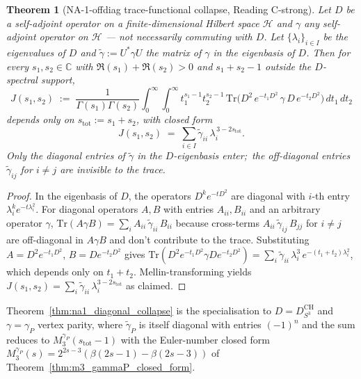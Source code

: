\documentclass[11pt,a4paper]{article}
\theoremstyle{plain}
\newtheorem{theorem}{Theorem}[section]
\theoremstyle{definition}
\newcommand{\sthree}{S^{3}}
\newcommand{\C}{\mathbb{C}}
\newcommand{\Tr}{\mathrm{Tr}}
\newcommand{\Hcal}{\mathcal{H}}
\begin{document}
\begin{theorem}[NA-1-offdiag trace-functional collapse, Reading
C-strong]
\label{thm:na1_trace_functional_collapse}
Let $D$ be a self-adjoint operator on a finite-dimensional Hilbert
space $\Hcal$ and $\gamma$ \emph{any} self-adjoint operator on
$\Hcal$ --- not necessarily commuting with $D$.  Let
$\{\lambda_i\}_{i \in I}$ be the eigenvalues of $D$ and
$\widetilde{\gamma} := U^* \gamma U$ the matrix of $\gamma$ in the
eigenbasis of $D$.  Then for every $s_1, s_2 \in \C$ with
$\Re(s_1) + \Re(s_2) > 0$ and $s_1 + s_2 - 1$ outside the
$D$-spectral support,
\begin{equation}
\label{eq:na1_J_general}
J(s_1, s_2)
\;:=\; \frac{1}{\Gamma(s_1)\Gamma(s_2)}
\int_0^\infty\!\!\!\int_0^\infty t_1^{s_1 - 1} t_2^{s_2 - 1}\,
\Tr\!\big(D^2\, e^{-t_1 D^2}\, \gamma\, D\, e^{-t_2 D^2}\big)\,
dt_1\, dt_2
\end{equation}
depends only on $s_{\mathrm{tot}} := s_1 + s_2$, with closed form
\begin{equation}
\label{eq:na1_J_general_closed}
J(s_1, s_2)
\;=\; \sum_{i \in I} \widetilde{\gamma}_{ii}\,
\lambda_i^{\,3 - 2 s_{\mathrm{tot}}}.
\end{equation}
Only the \emph{diagonal} entries of $\widetilde\gamma$ in the
$D$-eigenbasis enter;\ the off-diagonal entries
$\widetilde\gamma_{ij}$ for $i \ne j$ are invisible to the trace.
\end{theorem}

\begin{proof}
In the eigenbasis of $D$, the operators $D^k e^{-t D^2}$ are
diagonal with $i$-th entry $\lambda_i^k e^{-t \lambda_i^2}$.  For
diagonal operators $A, B$ with entries $A_{ii}, B_{ii}$ and an
arbitrary operator $\gamma$,
$\Tr(A \gamma B) = \sum_i A_{ii}\, \widetilde\gamma_{ii}\, B_{ii}$
because cross-terms $A_{ii}\, \widetilde\gamma_{ij}\, B_{jj}$ for
$i \ne j$ are off-diagonal in $A \gamma B$ and don't contribute to
the trace.  Substituting $A = D^2 e^{-t_1 D^2}$,
$B = D e^{-t_2 D^2}$ gives
$\Tr(D^2 e^{-t_1 D^2}\gamma D e^{-t_2 D^2})
   = \sum_i \widetilde\gamma_{ii}\, \lambda_i^3\, e^{-(t_1 + t_2)\lambda_i^2}$,
which depends only on $t_1 + t_2$.  Mellin-transforming yields
$J(s_1, s_2) = \sum_i \widetilde\gamma_{ii}\, \lambda_i^{3 - 2 s_{\mathrm{tot}}}$
as claimed.
\end{proof}

Theorem~\ref{thm:na1_diagonal_collapse} is the specialisation to
$D = D^{\mathrm{CH}}_{\sthree}$ and $\gamma = \gamma_P$ vertex
parity, where $\widetilde\gamma_P$ is itself diagonal with entries
$(-1)^n$ and the sum reduces to $M_3^{\gamma_P}(s_{\mathrm{tot}} - 1)$
with the Euler-number closed form
$M_3^{\gamma_P}(s) = 2^{2s - 3}(\beta(2s - 1) - \beta(2s - 3))$
of Theorem~\ref{thm:m3_gammaP_closed_form}.
\end{document}
